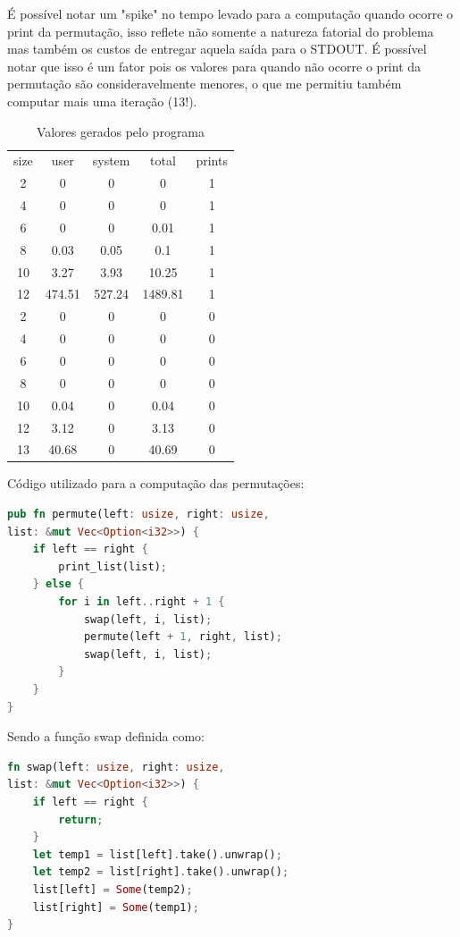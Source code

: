 \documentclass{article}
\begin{document}
\begin{enumerate}
    É possível notar um "spike" no tempo levado para a computação quando ocorre o print da permutação, isso reflete não somente a natureza fatorial do problema mas também os custos de entregar aquela saída para o STDOUT. É possível notar que isso é um fator pois os valores para quando não ocorre o print da permutação são consideravelmente menores, o que me permitiu também computar mais uma iteração (13!).
    \begin{table}[H]
        \centering
        \begin{tabular}{c|c|c|c|c}
        size & user   & system & total   & prints \\
        2    & 0      & 0      & 0       & 1      \\
        4    & 0      & 0      & 0       & 1      \\
        6    & 0      & 0      & 0.01    & 1      \\
        8    & 0.03   & 0.05   & 0.1     & 1      \\
        10   & 3.27   & 3.93   & 10.25   & 1      \\
        12   & 474.51 & 527.24 & 1489.81 & 1      \\ \hline
        2    & 0      & 0      & 0       & 0      \\
        4    & 0      & 0      & 0       & 0      \\
        6    & 0      & 0      & 0       & 0      \\
        8    & 0      & 0      & 0       & 0      \\
        10   & 0.04   & 0      & 0.04    & 0      \\
        12   & 3.12   & 0      & 3.13    & 0      \\
        13   & 40.68  & 0      & 40.69   & 0     
        \end{tabular}
        \caption{Valores gerados pelo programa}
    \end{table}
    Código utilizado para a computação das permutações:

    \begin{lstlisting}[language=Rust]
pub fn permute(left: usize, right: usize, 
list: &mut Vec<Option<i32>>) {
    if left == right {
        print_list(list);
    } else {
        for i in left..right + 1 {
            swap(left, i, list);
            permute(left + 1, right, list);
            swap(left, i, list);
        }
    }
}
    \end{lstlisting}
    Sendo a função swap definida como:
    \begin{lstlisting}[language=Rust]
fn swap(left: usize, right: usize, 
list: &mut Vec<Option<i32>>) {
    if left == right {
        return;
    }
    let temp1 = list[left].take().unwrap();
    let temp2 = list[right].take().unwrap();
    list[left] = Some(temp2);
    list[right] = Some(temp1);
}
    \end{lstlisting}
\end{enumerate}
\end{document}
